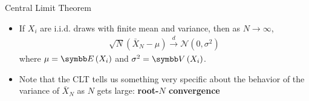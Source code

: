 \documentclass[aspectratio=169,11pt]{beamer}
\begin{document}





\begin{frame}{Central Limit Theorem}
\begin{itemize}
	\item If $X_i$ are i.i.d. draws with finite mean and variance, then as $N\rightarrow \infty$,
	\begin{align*}
		\sqrt{N} \left( \bar{X}_N  - \mu\right) \overset{d}{\rightarrow} \mathcal{N}\left(0,\sigma^2\right) 
	\end{align*}
	where $\mu=\E\left(X_i\right)$ and $\sigma^2 = \Var\left(X_i\right)$.

	\medskip
	\item Note that the CLT tells us something very specific about the behavior of
			the variance of $\bar{X}_N$ as $N$ gets large: {\bf root-$N$ convergence}
\end{itemize}
\end{frame}
\end{document}
